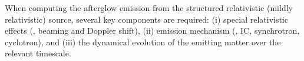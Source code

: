 
%
%

%
When computing the afterglow emission from the structured relativistic 
(mildly relativistic) source, several key components are required: 
(i) special relativistic effects (\eg, beaming and Doppler shift),
(ii) emission mechanism (\eg, \ac{IC}, synchrotron, cyclotron), 
and (iii) the dynamical evolution of the emitting matter over the 
relevant timescale. 

